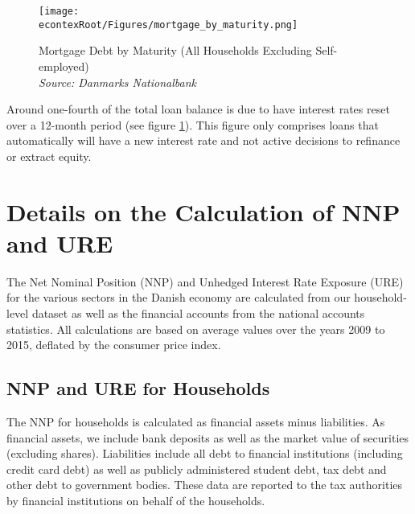 \documentclass[titlepage]{\econtex}\newcommand{\texname}{ConsumptionHeterogeneity}
\begin{document}
\begin{figure} 
	\begin{centering}
		\texttt{[image: \\econtexRoot/Figures/mortgage\_by\_maturity.png]} 
		\caption{Mortgage Debt by Maturity (All Households Excluding Self-employed)
		{\\ \emph{\footnotesize
	{Source: Danmarks Nationalbank}}
	}}
		\label{fig:mortgage_by_maturity}
	\end{centering}
\end{figure}

Around one-fourth of the total loan balance is due to have interest rates reset over a 12-month period (see figure \ref{fig:mortgage_by_maturity}). This figure only comprises loans that automatically will have a new interest rate and not active decisions to refinance or extract equity. 

\section{Details on the Calculation of NNP and URE}
\setcounter{figure}{0}   
\setcounter{table}{0} 
\label{URE_NNP_appendix}
The Net Nominal Position (NNP) and Unhedged Interest Rate Exposure (URE) for the various sectors in the Danish economy are calculated from our household-level dataset as well as the financial accounts from the national accounts statistics. All calculations are based on average values over the years 2009 to 2015, deflated by the consumer price index. 

\subsection{NNP and URE for Households}
The NNP for households is calculated as financial assets minus liabilities. As financial assets, we include bank deposits as well as the market value of securities (excluding shares). Liabilities include all debt to financial institutions (including credit card debt) as well as publicly administered student debt, tax debt and other debt to government bodies. These data are reported to the tax authorities by financial institutions on behalf of the households. 
\end{document}
